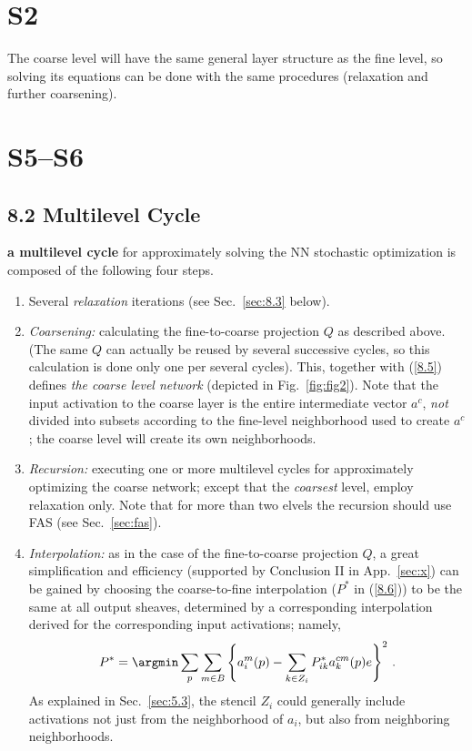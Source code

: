 \documentclass{article} %
\begin{document}
\section{S2}
The coarse level will have the same general layer structure as the fine level, so solving its equations can be done with the same procedures (relaxation and further coarsening).

\section{S5--S6}
\subsection{8.2 Multilevel Cycle}
\label{sec:multilevel_cycle}
{\bf a multilevel cycle} for approximately solving the NN stochastic optimization is composed of the following four steps.
\begin{enumerate}
    \item Several {\it relaxation} iterations (see Sec.~\ref{sec:8.3} below).
    \item {\it Coarsening:} calculating the fine-to-coarse projection $Q$ as described above. (The same $Q$ can actually be reused by several successive cycles, so this calculation is done only one per several cycles). This, together with (\ref{8.5}) defines {\it the coarse level network} (depicted in Fig.~\ref{fig:fig2}). Note that the input activation to the coarse layer is the entire intermediate vector $a^c$, {\it not} divided into subsets according to the fine-level neighborhood used to create $a^c$; the coarse level will create its own neighborhoods.
    \item {\it Recursion:} executing one or more multilevel cycles for approximately optimizing the coarse network; except that the {\it coarsest} level, employ relaxation only. Note that for more than two elvels the recursion should use FAS (see Sec.~\ref{sec:fas}).
    \item {\it Interpolation:} as in the case of the fine-to-coarse projection $Q$, a great simplification and efficiency (supported by Conclusion II in App.~\ref{sec:x}) can be gained by choosing the coarse-to-fine interpolation ($P^*$ in (\ref{8.6})) to be the same at all output sheaves, determined by a corresponding interpolation derived for the corresponding input activations; namely,
    \begin{equation}
        P^* = \argmin \sum_p \sum_{m \in B} \left\{ a^m_i(p) - \sum_{k \in Z_i} P^*_{ik} a^{cm}_k(p)e\right\}^2\,.
        \label{pstar_fit}
    \end{equation}
    As explained in Sec.~\ref{sec:5.3}, the stencil $Z_i$ could generally include activations not just from the neighborhood of $a_i$, but also from neighboring neighborhoods.
\end{enumerate}
\end{document}
